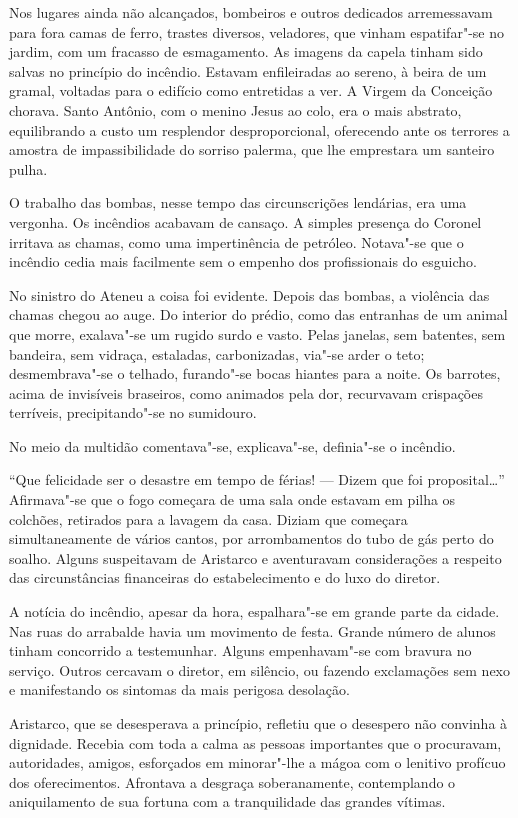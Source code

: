 Nos lugares ainda não alcançados, bombeiros e
outros dedicados arremessavam para fora camas de ferro, trastes
diversos, veladores, que vinham espatifar"-se no jardim, com um
fracasso de esmagamento. As imagens da capela tinham sido salvas no
princípio do incêndio. Estavam enfileiradas ao sereno, à beira de um
gramal, voltadas para o edifício como entretidas a ver. A Virgem da
Conceição chorava. Santo Antônio, com o menino Jesus ao colo, era o
mais abstrato, equilibrando a custo um resplendor desproporcional,
oferecendo ante os terrores a amostra de impassibilidade do sorriso
palerma, que lhe emprestara um santeiro pulha. 

O trabalho das bombas,
nesse tempo das circunscrições lendárias, era uma vergonha. Os
incêndios acabavam de cansaço. A simples presença do Coronel irritava
as chamas, como uma impertinência de petróleo. Notava"-se que o
incêndio cedia mais facilmente sem o empenho dos profissionais do
esguicho. 

No sinistro do Ateneu a coisa foi evidente. Depois das
bombas, a violência das chamas chegou ao auge. Do interior do prédio,
como das entranhas de um animal que morre, exalava"-se um rugido surdo
e vasto. Pelas janelas, sem batentes, sem bandeira, sem vidraça,
estaladas, carbonizadas, via"-se arder o teto; desmembrava"-se o
telhado, furando"-se bocas hiantes para a noite. Os barrotes, acima de
invisíveis braseiros, como animados pela dor, recurvavam crispações
terríveis, precipitando"-se no sumidouro. 

No meio da multidão comentava"-se, explicava"-se, definia"-se o incêndio. 

``Que felicidade ser o desastre em tempo de férias! --- Dizem que foi
proposital\ldots{}'' Afirmava"-se que o fogo começara de uma sala onde
estavam em pilha os colchões, retirados para a lavagem da casa. Diziam
que começara simultaneamente de vários cantos, por arrombamentos do
tubo de gás perto do soalho. Alguns suspeitavam de Aristarco e
aventuravam considerações a respeito das circunstâncias financeiras do
estabelecimento e do luxo do diretor. 

A notícia do incêndio, apesar da
hora, espalhara"-se em grande parte da cidade. Nas ruas do arrabalde
havia um movimento de festa. Grande número de alunos tinham concorrido
a testemunhar. Alguns empenhavam"-se com bravura no serviço. Outros
cercavam o diretor, em silêncio, ou fazendo 
exclamações sem nexo e manifestando os sintomas da mais perigosa
desolação. 

Aristarco, que se desesperava a princípio, refletiu que o
desespero não convinha à dignidade. Recebia com toda a calma as pessoas
importantes que o procuravam, autoridades, amigos, esforçados em
minorar"-lhe a mágoa com o lenitivo profícuo dos oferecimentos.
Afrontava a desgraça soberanamente, contemplando o aniquilamento de sua
fortuna com a tranquilidade das grandes vítimas. 

